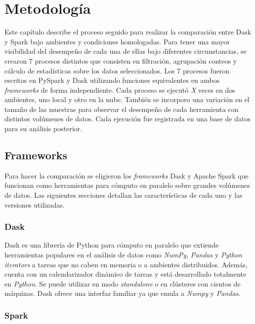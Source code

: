\chapter{Metodología}

\noindent Este capítulo describe el proceso seguido para realizar la comparación entre Dask y Spark bajo ambientes y condiciones homologadas. Para tener una mayor visibilidad del desempeño de cada una de ellas bajo diferentes circunstancias, se crearon 7 procesos distintos que consisten en filtración, agrupación conteos y cálculo de estadísticas sobre los datos seleccionados. Los 7 procesos fueron escritos en PySpark y Dask utilizando funciones equivalentes en ambos \textit{frameworks} de forma independiente. Cada proceso se ejecutó \textit{\LARGE X} veces en dos ambientes, uno local y otro en la nube. También se incorporo una variación en el tamaño de las muestras para observar el desempeño de cada herramienta con distintos volúmenes de datos. Cada ejecución fue registrada en una base de datos para su análisis posterior. 
\newpage

\section{Frameworks}

Para hacer la comparación se eligieron los \textit{frameworks} Dask y Apache Spark que funcionan como herramientas para cómputo en paralelo sobre grandes volúmenes de datos. Las siguientes secciones detallan las características de cada uno y las versiones utilizadas.

\subsection{Dask}

Dask es una librería de Python para cómputo en paralelo que extiende herramientas populares en el análisis de datos como \textit{NumPy}, \textit{Pandas} y \textit{Python iterators} a tareas que no caben en memoria o a ambientes distribuidos. Además, cuenta con un calendarizador dinámico de tareas y está desarrollado totalmente en \textit{Python}. Se puede utilizar en modo \textit{standalone} o en clústeres con cientos de máquinas. Dask ofrece una interfaz familiar ya que emula a \textit{Numpy} y \textit{Pandas}. 

\subsection{Spark}

